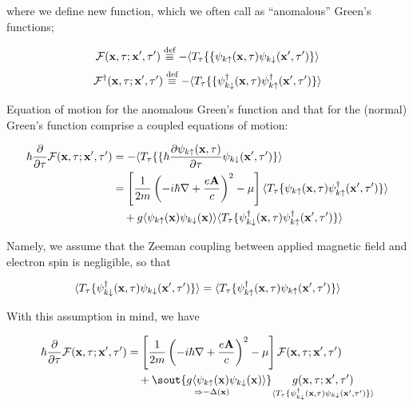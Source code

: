 where we define new function, which we often call as ``anomalous'' Green's functions; 

\[\mathcal{F}({\bf x},\tau;{\bf x'},\tau') \overset{\text{def}}{\equiv}-\langle T_\tau\{\{\psi_{k\uparrow}({\bf x},\tau)\psi_{k\downarrow}({\bf x'},\tau')\}\rangle \]
\[\mathcal{F}^\dagger({\bf x},\tau;{\bf x'},\tau') \overset{\text{def}}{\equiv}-\langle T_\tau\{\{\psi^\dagger_{k\downarrow}({\bf x},\tau)\psi^\dagger_{k\uparrow}({\bf x'},\tau')\}\rangle \]

Equation of motion for the anomalous Green's function and that for the (normal) Green's function comprise a  coupled equations of motion:

\[\begin{split}
\hbar\frac{\partial}{\partial\tau}\mathcal{F}({\bf x},\tau;{\bf x'},\tau') &= -\langle T_\tau\{\{\hbar\frac{\partial\psi_{k\uparrow}({\bf x},\tau)}{\partial\tau}\psi_{k\downarrow}({\bf x'},\tau')\}\rangle\\
&= \left[\frac{1}{2m}\left(-i\hbar\nabla+\frac{e{\bf A}}{c}\right)^2-\mu\right]\langle T_\tau \{\psi_{k\uparrow}({\bf x},\tau)\psi^\dagger_{k\uparrow}({\bf x'},\tau')\}\rangle\\
&\quad + g\langle\psi_{k\uparrow}({\bf x})\psi_{k\downarrow}({\bf x})\rangle\langle T_\tau \{\psi^\dagger_{k\downarrow}({\bf x},\tau)\psi^\dagger_{k\uparrow}({\bf x'},\tau')\}\rangle
\end{split}\]

Namely, we assume that the Zeeman coupling between applied magnetic field and electron spin is negligible, so that

\[\langle T_\tau\{\psi_{k\downarrow}^\dagger({\bf x},\tau)\psi_{k\downarrow}({\bf x'},\tau')\}\rangle = \langle T_\tau\{\psi_{k\uparrow}^\dagger({\bf x},\tau)\psi_{k\uparrow}({\bf x'},\tau')\}\rangle  \]

With this assumption in mind, we have

\[\begin{split}
\hbar\frac{\partial}{\partial\tau}\mathcal{F}({\bf x},\tau;{\bf x'},\tau') 
&= \left[\frac{1}{2m}\left(-i\hbar\nabla+\frac{e{\bf A}}{c}\right)^2-\mu\right]\mathcal{F}({\bf x},\tau;{\bf x'},\tau') \\
&\quad + \underset{\Rightarrow-\Delta({\bf x})}{\sout{g\langle\psi_{k\uparrow}({\bf x})\psi_{k\downarrow}({\bf x})\rangle}} \underset{\langle T_\tau\{\psi_{k\downarrow}^\dagger({\bf x},\tau)\psi_{k\downarrow}({\bf x'},\tau')\}\rangle}{\quad g({\bf x},\tau;{\bf x'},\tau') \quad}
\end{split}\]

